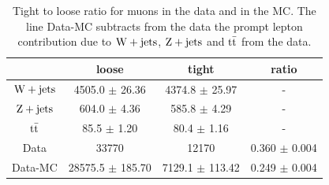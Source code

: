 \begin{table}[!htbp]
\begin{center}
\begin{tabular}{|c|c|c|c|}
\hline
 & 	 loose & 	 tight & 	 ratio \\
\hline
$\mathrm{W} + \text{jets}$ & 	4505.0 $\pm$ 26.36 & 	4374.8 $\pm$ 25.97 & 	     -     \\
$\mathrm{Z} + \text{jets}$ & 	604.0 $\pm$ 4.36 & 	585.8 $\pm$ 4.29 & 	     -     \\
$\mathrm{t}\bar{\mathrm{t}}$ & 	85.5 $\pm$ 1.20 & 	80.4 $\pm$ 1.16 & 	     -     \\
\hline
Data & 	33770 & 	12170 & 	0.360 $\pm$ 0.004 \\
\hline
Data-MC &	28575.5 $\pm$ 185.70 & 	7129.1 $\pm$ 113.42 & 	0.249 $\pm$ 0.004 \\
\hline
\end{tabular}
\caption{Tight to loose ratio for muons in the data and in the MC. The line
    Data-MC subtracts from the data the prompt lepton contribution due to
    $\mathrm{W} + \text{jets}$, 
$\mathrm{Z} + \text{jets}$ and $\mathrm{t}\bar{\mathrm{t}}$ from the data.}
\label{tab:FRwMCMu}
\end{center}
\end{table}

